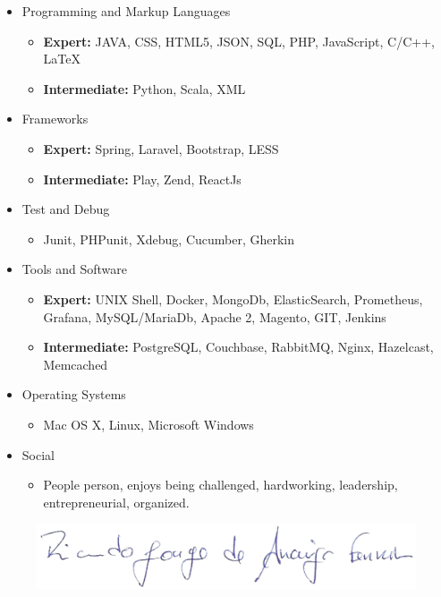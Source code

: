 \documentclass[letterpaper,11pt]{article}
\newcommand{\resitem}[1]{\item #1 \vspace{2pt}}
\begin{document}
\begin{itemize}
\item
	Programming and Markup Languages
	\begin{itemize}
		\resitem{{\bf Expert:}  JAVA, CSS, HTML5, JSON, SQL, PHP, JavaScript, C/C++, \LaTeX}
		\resitem{{\bf Intermediate:} Python, Scala, XML }
    \end{itemize}
\end{itemize} 
\hspace{20pt}
\begin{itemize}
\item
	Frameworks
	\begin{itemize}
		\resitem{{\bf Expert:} Spring, Laravel, Bootstrap, LESS}
		\resitem{{\bf Intermediate:} Play, Zend, ReactJs}
	\end{itemize}
	
	\item
	Test and Debug
	\begin{itemize}
		\resitem{Junit, PHPunit, Xdebug, Cucumber, Gherkin}
	\end{itemize}

\item
	Tools and Software
	\begin{itemize}
		\resitem{{\bf Expert:} UNIX Shell, Docker, MongoDb, ElasticSearch, Prometheus, Grafana, MySQL/MariaDb, Apache 2, Magento, GIT, Jenkins}
		\resitem{{\bf Intermediate:} PostgreSQL, Couchbase, RabbitMQ, Nginx, Hazelcast, Memcached}
	\end{itemize}
	
	\item
	Operating Systems
	\begin{itemize}
		\resitem{Mac OS X, Linux, Microsoft Windows}
	\end{itemize}

	\item
	Social
	\begin{itemize}
		\resitem{People person, enjoys being challenged, hardworking, leadership, entrepreneurial, organized.}
	\end{itemize}
\end{itemize}



\vspace{5mm}

\begin{figure}[h]
\centering
{\includegraphics[scale=0.25]{img/sig.png}}
\end{figure}
\end{document}
